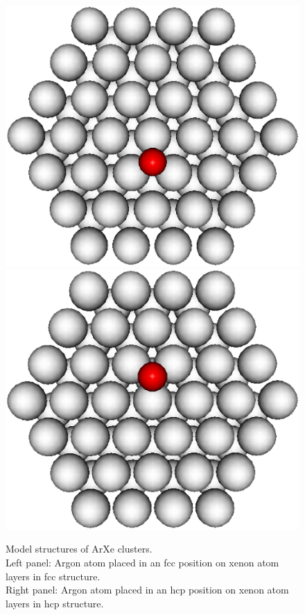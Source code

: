 \begin{figure}[htb]
 \centering
 \includegraphics[scale=0.27]{pics/fcc.eps}
 \includegraphics[scale=0.27]{pics/hcp.eps}
 \caption{Model structures of ArXe clusters.\\
          Left panel: Argon atom placed
          in an \ac{fcc} position on xenon atom layers in \ac{fcc} structure.\\
          Right panel: Argon atom placed
          in an \ac{hcp} position on xenon atom layers in \ac{hcp} structure.}
 \label{figure:model_clusters}
\end{figure}

